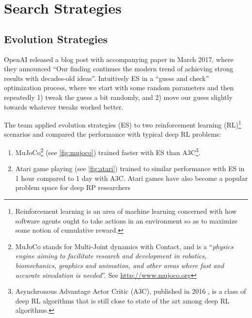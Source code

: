 
\chapter{Search Strategies}
\section{Evolution Strategies} \label{sec:ES}
OpenAI released a blog post \cite{Karpathy} with accompanying paper \cite{Salimans2017} in March 2017, where they announced ``Our finding continues the modern trend of achieving strong results with decades-old ideas''. Intuitively ES in a ``guess and check'' optimization process, where we start with some random parameters and then repeatedly 1) tweak the guess a bit randomly, and 2) move our guess slightly towards whatever tweaks worked better.

The team applied evolution strategies (ES) to two reinforcement learning (RL)\footnote{Reinforcement learning is an area of machine learning concerned with how software agents ought to take actions in an environment so as to maximize some notion of cumulative reward.} scenarios and compared the performance with typical deep RL problems:

\begin{enumerate}
    \item MuJoCo\footnote{MuJoCo stands for Multi-Joint dynamics with Contact, and is a ``\textit{physics engine aiming to facilitate research and development in robotics, biomechanics, graphics and animation, and other areas where fast and accurate simulation is needed}''. See \url{http://www.mujoco.org}} (see \cref{fig:mujoco}) trained faster with ES than A3C\footnote{Asynchronous Advantage Actor Critic (A3C), published in 2016 \cite{Mnih2016}, is a class of deep RL algorithms that is still close to state of the art among deep RL algorithms.}.
    \item Atari game playing (see \cref{fig:atari}) trained to similar performance with ES in 1 hour compared to 1 day with A3C. Atari games have also become a popular problem space for deep RP researchers
\end{enumerate}

